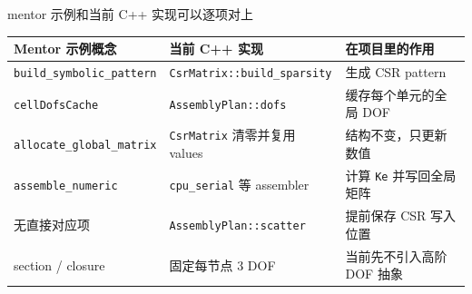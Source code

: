 \documentclass[UTF8,aspectratio=169,10pt]{ctexbeamer}
\newcommand{\smallsource}[1]{\vspace{0.4em}{\scriptsize\textcolor{pgsaGray}{Source: #1}}}
\begin{document}
\begin{frame}{mentor 示例和当前 C++ 实现可以逐项对上}
\begin{adjustbox}{max width=\textwidth}
\begin{tabular}{lll}
\toprule
Mentor 示例概念 & 当前 C++ 实现 & 在项目里的作用 \\
\midrule
\texttt{build\_symbolic\_pattern} & \texttt{CsrMatrix::build\_sparsity} & 生成 CSR pattern \\
\texttt{cellDofsCache} & \texttt{AssemblyPlan::dofs} & 缓存每个单元的全局 DOF \\
\texttt{allocate\_global\_matrix} & \texttt{CsrMatrix} 清零并复用 values & 结构不变，只更新数值 \\
\texttt{assemble\_numeric} & \texttt{cpu\_serial} 等 assembler & 计算 \texttt{Ke} 并写回全局矩阵 \\
无直接对应项 & \texttt{AssemblyPlan::scatter} & 提前保存 CSR 写入位置 \\
section / closure & 固定每节点 3 DOF & 当前先不引入高阶 DOF 抽象 \\
\bottomrule
\end{tabular}
\end{adjustbox}
\smallsource{docs/cpu/symbolic\_numeric\_assembly.md; results/2026-05-11-symbolic-numeric/symbolic\_numeric\_eval\_report.md}
\end{frame}
\end{document}
